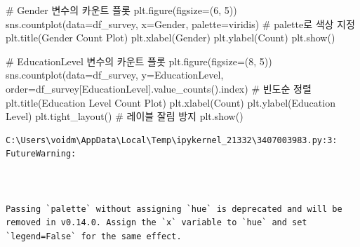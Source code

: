 \documentclass[
  letterpaper,
]{book}
\newenvironment{Shaded}{\begin{snugshade}}{\end{snugshade}}
\newcommand{\CommentTok}[1]{\textcolor[rgb]{0.37,0.37,0.37}{#1}}
\newcommand{\DecValTok}[1]{\textcolor[rgb]{0.68,0.00,0.00}{#1}}
\newcommand{\NormalTok}[1]{\textcolor[rgb]{0.00,0.23,0.31}{#1}}
\newcommand{\OperatorTok}[1]{\textcolor[rgb]{0.37,0.37,0.37}{#1}}
\newcommand{\StringTok}[1]{\textcolor[rgb]{0.13,0.47,0.30}{#1}}
\begin{document}
\begin{Shaded}
\begin{Highlighting}[]
\CommentTok{\# Gender 변수의 카운트 플롯}
\NormalTok{plt.figure(figsize}\OperatorTok{=}\NormalTok{(}\DecValTok{6}\NormalTok{, }\DecValTok{5}\NormalTok{))}
\NormalTok{sns.countplot(data}\OperatorTok{=}\NormalTok{df\_survey, x}\OperatorTok{=}\StringTok{\textquotesingle{}Gender\textquotesingle{}}\NormalTok{, palette}\OperatorTok{=}\StringTok{\textquotesingle{}viridis\textquotesingle{}}\NormalTok{) }\CommentTok{\# palette로 색상 지정}
\NormalTok{plt.title(}\StringTok{\textquotesingle{}Gender Count Plot\textquotesingle{}}\NormalTok{)}
\NormalTok{plt.xlabel(}\StringTok{\textquotesingle{}Gender\textquotesingle{}}\NormalTok{)}
\NormalTok{plt.ylabel(}\StringTok{\textquotesingle{}Count\textquotesingle{}}\NormalTok{)}
\NormalTok{plt.show()}

\CommentTok{\# EducationLevel 변수의 카운트 플롯}
\NormalTok{plt.figure(figsize}\OperatorTok{=}\NormalTok{(}\DecValTok{8}\NormalTok{, }\DecValTok{5}\NormalTok{))}
\NormalTok{sns.countplot(data}\OperatorTok{=}\NormalTok{df\_survey, y}\OperatorTok{=}\StringTok{\textquotesingle{}EducationLevel\textquotesingle{}}\NormalTok{, order}\OperatorTok{=}\NormalTok{df\_survey[}\StringTok{\textquotesingle{}EducationLevel\textquotesingle{}}\NormalTok{].value\_counts().index) }\CommentTok{\# 빈도순 정렬}
\NormalTok{plt.title(}\StringTok{\textquotesingle{}Education Level Count Plot\textquotesingle{}}\NormalTok{)}
\NormalTok{plt.xlabel(}\StringTok{\textquotesingle{}Count\textquotesingle{}}\NormalTok{)}
\NormalTok{plt.ylabel(}\StringTok{\textquotesingle{}Education Level\textquotesingle{}}\NormalTok{)}
\NormalTok{plt.tight\_layout() }\CommentTok{\# 레이블 잘림 방지}
\NormalTok{plt.show()}
\end{Highlighting}
\end{Shaded}

\begin{verbatim}
C:\Users\voidm\AppData\Local\Temp\ipykernel_21332\3407003983.py:3: FutureWarning:



Passing `palette` without assigning `hue` is deprecated and will be removed in v0.14.0. Assign the `x` variable to `hue` and set `legend=False` for the same effect.

\end{verbatim}
\end{document}
